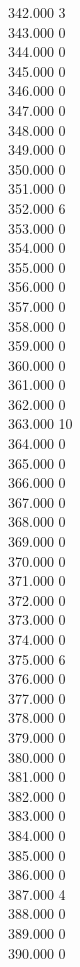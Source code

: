 { 342.000	3 \\
 343.000	0 \\
 344.000	0 \\
 345.000	0 \\
 346.000	0 \\
 347.000	0 \\
 348.000	0 \\
 349.000	0 \\
 350.000	0 \\
 351.000	0 \\
 352.000	6 \\
 353.000	0 \\
 354.000	0 \\
 355.000	0 \\
 356.000	0 \\
 357.000	0 \\
 358.000	0 \\
 359.000	0 \\
 360.000	0 \\
 361.000	0 \\
 362.000	0 \\
 363.000	10 \\
 364.000	0 \\
 365.000	0 \\
 366.000	0 \\
 367.000	0 \\
 368.000	0 \\
 369.000	0 \\
 370.000	0 \\
 371.000	0 \\
 372.000	0 \\
 373.000	0 \\
 374.000	0 \\
 375.000	6 \\
 376.000	0 \\
 377.000	0 \\
 378.000	0 \\
 379.000	0 \\
 380.000	0 \\
 381.000	0 \\
 382.000	0 \\
 383.000	0 \\
 384.000	0 \\
 385.000	0 \\
 386.000	0 \\
 387.000	4 \\
 388.000	0 \\
 389.000	0 \\
 390.000	0 \\
}
